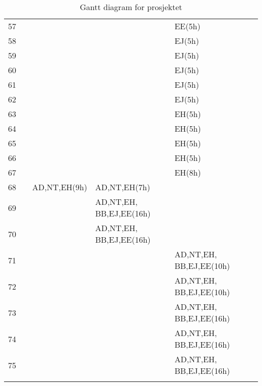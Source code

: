 \begin{longtable}[l]{|c|X|X|X|X|X|}
	57 	& 		 			& 					& 					& EE(5h)					\\ 
	58 	& 					& 					& 					& EJ(5h)					\\ 
	59 	& 					& 					& 					& EJ(5h)					\\ 	
	60 	& 					& 					& 					& EJ(5h)					\\ 
	61 	& 		 			& 					& 					& EJ(5h)					\\ 
	62 	& 					& 					& 					& EJ(5h)					\\ 
	63 	& 					& 					& 					& EH(5h)					\\ 	
	64 	& 					& 					& 					& EH(5h)					\\ 
	65 	& 		 			& 					& 					& EH(5h)					\\ 
	66 	& 					& 					& 					& EH(5h)					\\ 
	67 	& 					& 					& 					& EH(8h)					\\ 	
	68 	& 					& AD,NT,EH(9h)			& AD,NT,EH(7h)			&					\\ 
	69 	& 		 			& 					& AD,NT,EH, BB,EJ,EE(16h)& 					\\ 
	70 	& 					& 					& AD,NT,EH, BB,EJ,EE(16h)& 					\\ 
	71 	& 					& 					& 					& AD,NT,EH, BB,EJ,EE(10h)\\ 	
	72 	& 					& 					& 					& AD,NT,EH, BB,EJ,EE(10h)\\ 
	73 	& 		 			& 					& 					& AD,NT,EH, BB,EJ,EE(16h)\\ 
	74	& 					& 					& 					& AD,NT,EH, BB,EJ,EE(16h)\\ 	
	75 	& 					& 					& 					& AD,NT,EH, BB,EJ,EE(16h)\\ \hline
	\caption {Gantt diagram for prosjektet}
	\end{longtable}